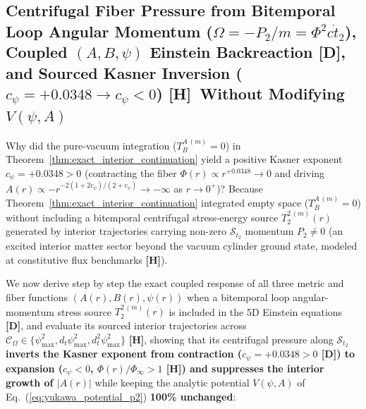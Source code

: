 \documentclass[11pt,a4paper]{article}
\newcommand{\catD}{\textbf{\textcolor{blue!75!black}{[D]}}}
\newcommand{\catH}{\textbf{\textcolor{orange!85!black}{[H]}}}
\theoremstyle{plain}
\theoremstyle{definition}
\theoremstyle{remark}
\numberwithin{equation}{section}
\begin{document}
\subsection{\texorpdfstring{Centrifugal Fiber Pressure from Bitemporal Loop Angular Momentum ($\Omega = -P_2/m = \Phi^2 c\dot{t}_2$), Coupled $(A, B, \psi)$ Einstein Backreaction \catD, and Sourced Kasner Inversion ($c_{\psi} = +0.0348 \to c_{\psi} < 0$) \catH\ Without Modifying $V(\psi,A)$}{Centrifugal Fiber Pressure from Bitemporal Loop Angular Momentum, Coupled (A, B, psi) Einstein Backreaction, and Sourced Kasner Inversion}}

Why did the pure-vacuum integration ($T^{A\,(m)}_B = 0$) in Theorem~\ref{thm:exact_interior_continuation} yield a positive Kasner exponent $c_{\psi} = +0.0348 > 0$ (contracting the fiber $\Phi(r) \propto r^{+0.0348} \to 0$ and driving $A(r) \propto -r^{-2(1 + 2c_{\psi})/(2 + c_{\psi})} \to -\infty$ as $r \to 0^+$)? Because Theorem~\ref{thm:exact_interior_continuation} integrated empty space ($T^{A\,(m)}_B = 0$) without including a bitemporal centrifugal stress-energy source $T^{2\,(m)}_2(r)$ generated by interior trajectories carrying non-zero $\mathcal{S}_{t_2}$ momentum $P_2 \neq 0$ (an excited interior matter sector beyond the vacuum cylinder ground state, modeled at constitutive flux benchmarks \catH).

We now derive step by step the exact coupled response of all three metric and fiber functions $(A(r), B(r), \psi(r))$ when a bitemporal loop angular-momentum stress source $T^{2\,(m)}_2(r)$ is included in the 5D Einstein equations \catD, and evaluate its sourced interior trajectories across $\mathcal{C}_{\Omega} \in \{\psi_{\max}^2, d_t\psi_{\max}^2, d_t^2\psi_{\max}^2\}$ \catH, showing that its centrifugal pressure along $\mathcal{S}_{t_2}$ \textbf{inverts the Kasner exponent from contraction ($c_{\psi} = +0.0348 > 0$ \catD) to expansion ($c_{\psi} < 0$, $\Phi(r)/\Phi_{\infty} > 1$ \catH) and suppresses the interior growth of $|A(r)|$} while keeping the analytic potential $V(\psi, A)$ of Eq.~(\ref{eq:yukawa_potential_p2}) \textbf{100\% unchanged}:
\end{document}
